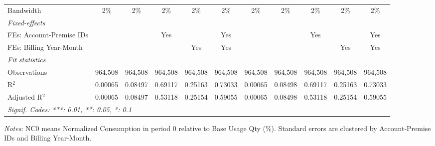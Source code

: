 \begin{table}[htbp]
\begin{adjustbox}{scale = 0.75}
\begin{tabular}{lcccccccccc}
& & & & & & & & & & \\
\midrule Bandwidth & 2\% & 2\% & 2\% & 2\% & 2\% & 2\% & 2\% & 2\% & 2\% & 2\%\\
\midrule
\emph{Fixed-effects}&   &   &   &   &   &   &   &   &   &  \\
FEs: Account-Premise IDs &  &  & Yes &  & Yes &  &  & Yes &  & Yes\\
FEs: Billing Year-Month &  &  &  & Yes & Yes &  &  &  & Yes & Yes\\
\midrule
\emph{Fit statistics}&  & & & & & & & & & \\
Observations & 964,508&964,508&964,508&964,508&964,508&964,508&964,508&964,508&964,508&964,508\\
R$^2$ & 0.00065&0.08497&0.69117&0.25163&0.73033&0.00065&0.08498&0.69117&0.25163&0.73033\\
Adjusted R$^2$ & 0.00065&0.08497&0.53118&0.25154&0.59055&0.00065&0.08498&0.53118&0.25154&0.59055\\
\bottomrule\bottomrule
\multicolumn{11}{l}{\emph{Signif. Codes: ***: 0.01, **: 0.05, *: 0.1}}\\
\end{tabular}
\end{adjustbox}
\begin{tablenotes}
\footnotesize
\emph{\medskip Notes}: NC0 means Normalized Consumption in period 0 relative to Base Usage Qty (\%). Standard errors are clustered by Account-Premise IDs and Billing Year-Month.
\end{tablenotes}
\end{table}